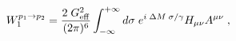 \begin{equation} 
W^{p_1 \to p_2}_{1}
=
\frac{2\; G_{\rm eff}^2}{(2\pi)^6 }
\int_{- \infty}^{+\infty} d \sigma \;
e^{i\; \Delta M \; \sigma/\gamma} 
H_{\mu \nu} A^{\mu \nu} \; ,
\label{Waux2}
\end{equation}

